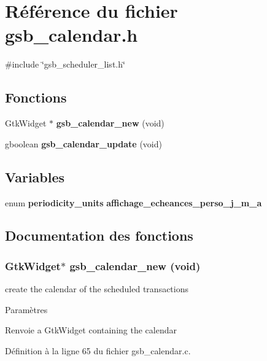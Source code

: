 \section{Référence du fichier gsb\_\-calendar.h}
\label{gsb__calendar_8h}
{\ttfamily \#include \char`\"{}gsb\_\-scheduler\_\-list.h\char`\"{}}\par
\subsection*{Fonctions}
\begin{DoxyCompactItemize}
\item 
GtkWidget $\ast$ {\bf gsb\_\-calendar\_\-new} (void)
\item 
gboolean {\bf gsb\_\-calendar\_\-update} (void)
\end{DoxyCompactItemize}
\subsection*{Variables}
\begin{DoxyCompactItemize}
\item 
enum {\bf periodicity\_\-units} {\bf affichage\_\-echeances\_\-perso\_\-j\_\-m\_\-a}
\end{DoxyCompactItemize}


\subsection{Documentation des fonctions}
\subsubsection[{gsb\_\-calendar\_\-new}]{\setlength{\rightskip}{0pt plus 5cm}GtkWidget$\ast$ gsb\_\-calendar\_\-new (void)}\label{gsb__calendar_8h_aec6d02bd75e77dbd63dbb3b1120fdf6b}
create the calendar of the scheduled transactions


\begin{DoxyParams}{Paramètres}
\item[{\em }]\end{DoxyParams}
\begin{DoxyReturn}{Renvoie}
a GtkWidget containing the calendar 
\end{DoxyReturn}


Définition à la ligne 65 du fichier gsb\_\-calendar.c.

